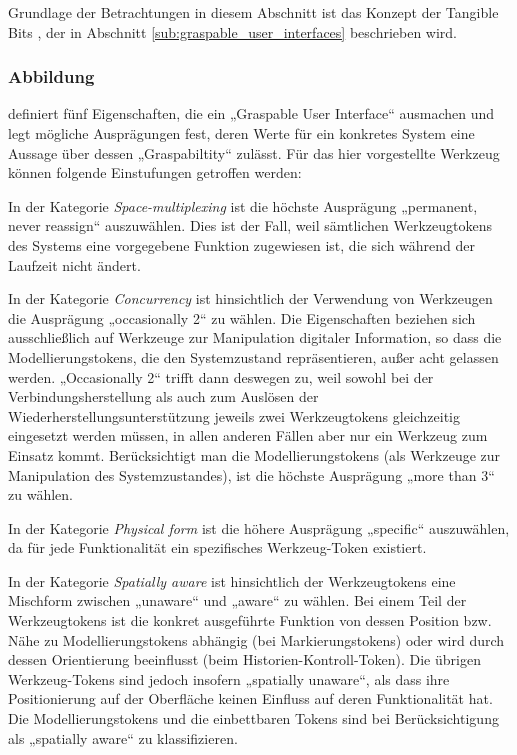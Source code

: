 Grundlage der Betrachtungen in diesem Abschnitt ist das Konzept der Tangible Bits \citep{Fitzmaurice96}, der in Abschnitt \ref{sub:graspable_user_interfaces} beschrieben wird.

\subsubsection{Abbildung}

\citet{Fitzmaurice96} definiert fünf Eigenschaften, die ein „Graspable User Interface“ ausmachen und legt mögliche Ausprägungen fest, deren Werte für ein konkretes System eine Aussage über dessen „Graspabiltity“ zulässt. Für das hier vorgestellte Werkzeug können folgende Einstufungen getroffen werden:

In der Kategorie \emph{Space-multiplexing} ist die höchste Ausprägung „permanent, never reassign“ auszuwählen. Dies ist der Fall, weil sämtlichen Werkzeugtokens des Systems eine vorgegebene Funktion zugewiesen ist, die sich während der Laufzeit nicht ändert.

In der Kategorie \emph{Concurrency} ist hinsichtlich der Verwendung von Werkzeugen die Ausprägung „occasionally 2“ zu wählen. Die Eigenschaften beziehen sich ausschließlich auf Werkzeuge zur Manipulation digitaler Information, so dass die Modellierungstokens, die den Systemzustand repräsentieren, außer acht gelassen werden. „Occasionally 2“ trifft dann deswegen zu, weil sowohl bei der Verbindungsherstellung als auch zum Auslösen der Wiederherstellungsunterstützung jeweils zwei Werkzeugtokens gleichzeitig eingesetzt werden müssen, in allen anderen Fällen aber nur ein Werkzeug zum Einsatz kommt. Berücksichtigt man die Modellierungstokens (als Werkzeuge zur Manipulation des Systemzustandes), ist die höchste Ausprägung „more than 3“ zu wählen.

In der Kategorie \emph{Physical form} ist die höhere Ausprägung „specific“ auszuwählen, da für jede Funktionalität ein spezifisches Werkzeug-Token existiert.

In der Kategorie \emph{Spatially aware} ist hinsichtlich der Werkzeugtokens eine Mischform zwischen „unaware“ und „aware“ zu wählen. Bei einem Teil der Werkzeugtokens ist die konkret ausgeführte Funktion von dessen Position bzw. Nähe zu Modellierungstokens abhängig (bei Markierungstokens) oder wird durch dessen Orientierung beeinflusst (beim Historien-Kontroll-Token). Die übrigen Werkzeug-Tokens sind jedoch insofern „spatially unaware“, als dass ihre Positionierung auf der Oberfläche keinen Einfluss auf deren Funktionalität hat. Die Modellierungstokens und die einbettbaren Tokens sind bei Berücksichtigung als „spatially aware“ zu klassifizieren.

